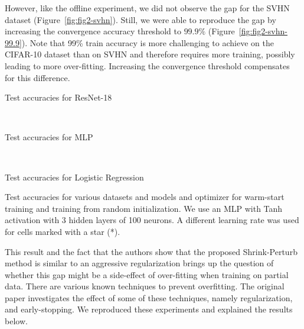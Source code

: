However, like the offline experiment, we did not observe the gap for the SVHN dataset (Figure~\ref{fig:fig2-svhn}). Still, we were able to reproduce the gap by increasing the convergence accuracy threshold to $99.9\%$ (Figure~\ref{fig:fig2-svhn-99.9}). Note that 99\% train accuracy is more challenging to achieve on the CIFAR-10 dataset than on SVHN and therefore requires more training, possibly leading to more over-fitting. Increasing the convergence threshold compensates for this difference. 

\setlength{\intextsep}{5pt}%
\begin{table}

\renewcommand{\arraystretch}{1.2}
\centering
\begin{subtable} {\linewidth}
\centering
\begin{adjustbox}{max width=\linewidth}

\end{adjustbox}
\vspace{5pt}
\caption{Test accuracies for ResNet-18}
\vspace{5pt}
\end{subtable}\\
\begin{subtable} {\linewidth}
\centering
\begin{adjustbox}{max width=\linewidth}

\end{adjustbox}
\vspace{5pt}
\caption{Test accuracies for MLP}
\end{subtable}\\
\begin{subtable} {\linewidth}
\centering
\begin{adjustbox}{max width=\linewidth}

\end{adjustbox}

\caption{Test accuracies for Logistic Regression}
\end{subtable}
\caption{Test accuracies for various datasets and models and optimizer for warm-start training and training from random initialization. We use an MLP with Tanh activation with 3 hidden layers of 100 neurons. A different learning rate was used for cells marked with a star (*). }
\label{tab:offline-warmup-vs-random}
\vspace{-30pt}
\end{table}

This result and the fact that the authors show that the proposed Shrink-Perturb method is similar to an aggressive regularization brings up the question of whether this gap might be a side-effect of over-fitting when training on partial data.  There are various known techniques to prevent overfitting. The original paper investigates the effect of some of these techniques, namely regularization, and early-stopping. We reproduced these experiments and explained the results below.

